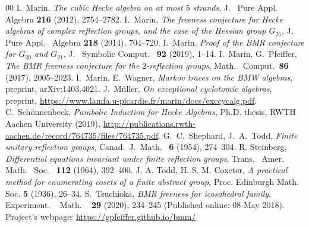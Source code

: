 \documentclass[11pt, reqno]{amsart}
\numberwithin{equation}{section}
\theoremstyle{remark}
\begin{document}
\begin{thebibliography}{00}
	  I.~Marin, \emph{The cubic Hecke algebra on at most $5$ strands}, J.~ Pure Appl.~ Algebra {\bf 216 }(2012), 2754--2782.
	  I.~Marin, \emph{The freeness conjecture for Hecke algebras of complex reflection groups, and the case of the Hessian group $G_{26}$}, J.~ Pure Appl.~ Algebra {\bf 218} (2014), 704--720.
	 I.~Marin, \emph{Proof of the BMR conjecture for $G_{20}$ and $G_{21}$}, J.~ Symbolic Comput.~ {\bf 92} (2019), 1--14.
	 I.~Marin, G.~Pfeiffer, \emph{The  BMR  freeness  conjecture  for  the  $2$-reflection  groups}, Math.~ Comput.~{\bf 86} (2017), 2005--2023.
	 I.~Marin, E.~Wagner, \emph{Markov traces on the BMW algebras}, preprint, arXiv:1403.4021.
	 J.~M{\"u}ller, \emph{On exceptional cyclotomic algebras}, preprint, \url{https://www.lamfa.u-picardie.fr/marin/docs/exccycalg.pdf}.
	C.~Sch\"onnenbeck, \emph{Parabolic Induction for Hecke Algebras}, Ph.D. thesis, 
	RWTH Aachen University  (2019), \url{http://publications.rwth-aachen.de/record/764735/files/764735.pdf}.
	 G.~C.~Shephard, J.~A.~Todd, \emph{Finite unitary reflection
		groups}, Canad.~J.~Math.~ {\bf 6} (1954), 274--304.
	 R. Steinberg, \emph{Differential equations invariant under finite reflection groups}, Trans.~ Amer.~ Math.~ Soc.~ {\bf 112} (1964), 392--400.
	 J. A. Todd, H. S. M. Coxeter, \emph{A practical method for enumerating cosets of a finite abstract group}, Proc. Edinburgh Math. Soc. {\bf 5} (1936), 26--34.
	 S.~Tsuchioka, \emph{BMR freeness for icosahedral family}, Experiment. ~  Math. ~ {\bf 29}  (2020), 234--245 (Published online: 08 May 2018).	
	 Project's webpage:  \url{https://gpfeiffer.github.io/bmm/}
	
\end{thebibliography}
\end{document}

